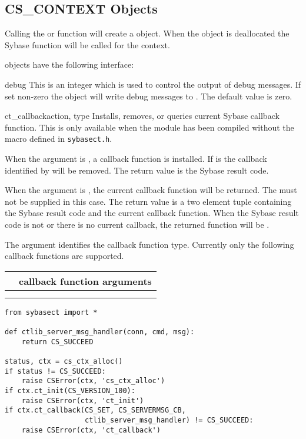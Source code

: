 \subsection{CS_CONTEXT Objects}

Calling the  or 
function will create a  object.  When the
 object is deallocated the Sybase
 function will be called for the context.

 objects have the following interface:

\begin{memberdesc}[CS_CONTEXT]{debug}
This is an integer which is used to control the output of debug
messages.  If set non-zero the object will write debug messages to
.  The default value is zero.
\end{memberdesc}

\begin{methoddesc}[CS_CONTEXT]{ct_callback}{action, type }
Installs, removes, or queries current Sybase callback function.  This
is only available when the  module has been compiled
without the  macro defined in \texttt{sybasect.h}.

When the  argument is , a callback function
is installed.  If  is  the callback identified
by  will be removed.  The return value is the Sybase result
code.

When the  argument is , the current callback
function will be returned.  The  must not be supplied in
this case.  The return value is a two element tuple containing the
Sybase result code and the current callback function.  When the Sybase
result code is not  or there is no current callback,
the returned function will be .

The  argument identifies the callback function type.
Currently only the following callback functions are supported.

\begin{longtable}{l|l}
\var{type} & callback function arguments \\
\hline
\code{CS_CLIENTMSG_CB} & \code{ctx, conn, msg} \\
\code{CS_SERVERMSG_CB} & \code{ctx, conn, msg} \\
\end{longtable}

\begin{verbatim}
from sybasect import *

def ctlib_server_msg_handler(conn, cmd, msg):
    return CS_SUCCEED

status, ctx = cs_ctx_alloc()
if status != CS_SUCCEED:
    raise CSError(ctx, 'cs_ctx_alloc')
if ctx.ct_init(CS_VERSION_100):
    raise CSError(ctx, 'ct_init')
if ctx.ct_callback(CS_SET, CS_SERVERMSG_CB,
                   ctlib_server_msg_handler) != CS_SUCCEED:
    raise CSError(ctx, 'ct_callback')
\end{verbatim}
\end{methoddesc}

